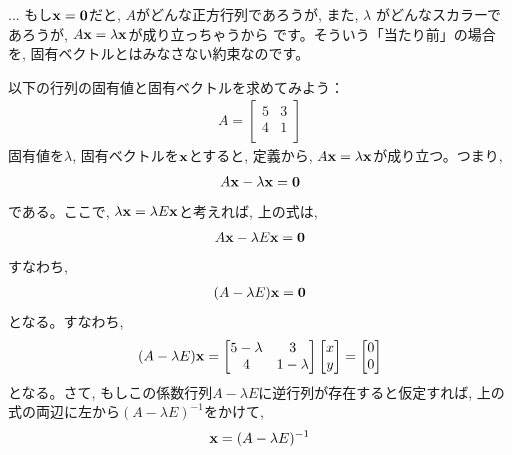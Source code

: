 \begin{faq}{\small{}
... もし${\bf x}={\bf 0}$だと, $A$がどんな正方行列であろうが, また, $\lambda$
がどんなスカラーであろうが, $A{\bf x}=\lambda{\bf x}$が成り立っちゃうから
です。そういう「当たり前」の場合を, 固有ベクトルとはみなさない約束なのです。}\end{faq}

\begin{exmpl}\label{ex:matrix_eigen1} 以下の行列の固有値と固有ベクトルを求めてみよう：
\begin{eqnarray}
A=\begin{bmatrix}
5 & 3 \\
4 & 1 \\
\end{bmatrix}
\end{eqnarray}
固有値を$\lambda$, 固有ベクトルを${\bf x}$とすると, 定義から, $A{\bf x}=\lambda {\bf x}$が成り立つ。つまり, 
\begin{eqnarray}
A{\bf x}-\lambda {\bf x}={\bf 0}
\end{eqnarray}
である。ここで, $\lambda {\bf x}=\lambda E {\bf x}$と考えれば, 上の式は, 
\begin{eqnarray}
A{\bf x}-\lambda E{\bf x}={\bf 0}
\end{eqnarray}
すなわち, 
\begin{eqnarray}
(A-\lambda E){\bf x}={\bf 0}\label{eq:matrix_eigen_eq0}
\end{eqnarray}
となる。すなわち, 
\begin{eqnarray}
(A-\lambda E){\bf x}=
\begin{bmatrix}
5-\lambda & 3 \\
4          & 1-\lambda \\
\end{bmatrix}
\begin{bmatrix}
x \\
y \\
\end{bmatrix}
=\begin{bmatrix}
0 \\
0 \\
\end{bmatrix}\label{eq:matrix_eigen_eq000}
\end{eqnarray}
となる。さて, もしこの係数行列$A-\lambda E$に逆行列が存在すると仮定すれば, 
上の式の両辺に左から$(A-\lambda E)^{-1}$をかけて, 
\begin{eqnarray}
{\bf x}
=(A-\lambda E)^{-1}

\end{eqnarray}
\end{exmpl}
